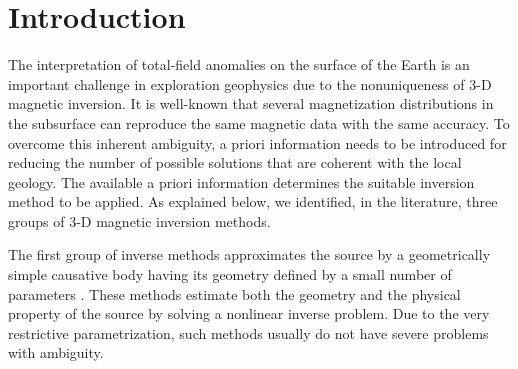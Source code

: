 \section{Introduction}

The interpretation of total-field anomalies on the surface of the Earth is an 
important challenge in exploration geophysics due to the nonuniqueness of 3-D magnetic 
inversion. It is well-known that several magnetization distributions in the subsurface 
can reproduce the same magnetic data with the same accuracy. 
To overcome this inherent ambiguity, a priori information needs to be introduced 
for reducing the number of possible solutions that are coherent with the local geology.
The available a priori information determines the suitable inversion method to be applied. 
As explained below, we identified, in the literature, three groups of 3-D magnetic inversion methods.

The first group of inverse methods approximates the source by a geometrically 
simple causative body having its geometry defined by a small number of parameters 
\cite[e.g., ][]{ballantyne-1980,bhattacharyya-1980,silva-1983,medeiros_silva1995}. These methods 
estimate both the geometry and the physical property of the source by solving 
a nonlinear inverse problem. Due to the very restrictive parametrization, 
such methods usually do not have severe problems with ambiguity.

